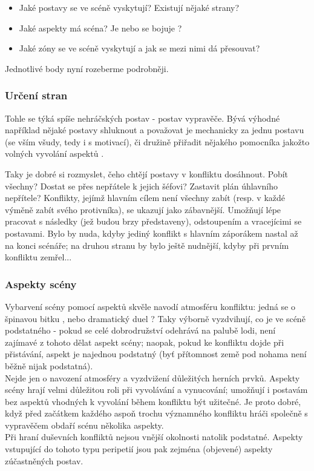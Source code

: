 \documentclass[../main.tex]{subfiles}
\begin{document}
\begin{itemize}
\item Jaké postavy se ve scéně vyskytují? Existují nějaké strany?
\item Jaké aspekty má scéna? Je  nebo se bojuje ?
\item Jaké zóny se ve scéně vyskytují a jak se mezi nimi dá přesouvat?
\end{itemize}

Jednotlivé body nyní rozeberme podrobněji.

\subsubsection{Určení stran}
\label{sec:urcenistran}
Tohle se týká spíše nehráčských postav - postav vypravěče. Bývá výhodné například nějaké postavy shluknout a považovat je mechanicky za jednu postavu (se vším všudy, tedy i s motivací), či družině přiřadit nějakého pomocníka jakožto volných vyvolání aspektů .

Taky je dobré si rozmyslet, čeho chtějí postavy v konfliktu dosáhnout. Pobít všechny? Dostat se přes nepřátele k jejich šéfovi? Zastavit plán úhlavního nepřítele? Konflikty, jejímž hlavním cílem není všechny zabít (resp. v každé výměně zabít svého protivníka), se ukazují jako zábavnější. Umožňují lépe pracovat s následky (jež budou brzy představeny), odstoupením a vracejícimi se postavami. Bylo by nuda, kdyby jediný konflikt s hlavním záporákem nastal až na konci scénáře; na druhou stranu by bylo ještě nudnější, kdyby při prvním konfliktu zemřel...

\subsubsection{Aspekty scény}
\label{sec:aspektysceny}

Vybarvení scény pomocí aspektů skvěle navodí atmosféru konfliktu: jedná se o špinavou bitku , nebo dramatický duel ? Taky výborně vyzdvihují, co je ve scéně podstatného - pokud se celé dobrodružství odehrává na palubě lodi, není zajímavé z tohoto dělat aspekt scény; naopak, pokud ke konfliktu dojde při přistávání, aspekt  je najednou podstatný (byť přítomnost země pod nohama není běžně nijak podstatná).\\
Nejde jen o navození atmosféry a vyzdvižení důležitých herních prvků. Aspekty scény hrají velmi důležitou roli při vyvolávání a vynucování; umožňují i postavám bez aspektů vhodných k vyvolání během konfliktu být užitečné. Je proto dobré, když před začátkem každého aspoň trochu významného konfliktu hráči společně s vypravěčem obdaří scénu několika aspekty.\\
Při hraní duševních konfliktů nejsou vnější okolnosti natolik podstatné. Aspekty vstupující do tohoto typu peripetií jsou pak zejména (objevené) aspekty zúčastněných postav.
\end{document}
